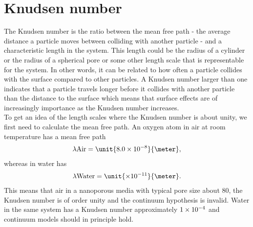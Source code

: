 \section{Knudsen number}
\label{sec:knudsen_number}
The Knudsen number is the ratio between the mean free path - the average distance a particle moves between colliding with another particle - and a characteristic length in the system. This length could be the radius of a cylinder or the radius of a spherical pore or some other length scale that is representable for the system. In other words, it can be related to how often a particle collides with the surface compared to other particles. A Knudsen number larger than one indicates that a particle travels longer before it collides with another particle than the distance to the surface which means that surface effects are of increasingly importance as the Knudsen number increases.\\
To get an idea of the length scales where the Knudsen number is about unity, we first need to calculate the mean free path. An oxygen atom in air at room temperature has a mean free path \cite{denny1993air}
\begin{align}
	\label{eq:air_mfp}
	\lambda{\text{Air}} = \unit{8.0\e{-8}}{\meter},
\end{align}
whereas in water has
\begin{align}
	\label{eq:water_mfp}
	\lambda{\text{Water}} = \unit{\e{-11}}{\meter}.
\end{align}
This means that air in a nanoporous media with typical pore size about \unit{80}{\nano\meter}, the Knudsen number is of order unity and the continuum hypothesis is invalid. Water in the same system has a Knudsen number approximately $1\times 10^{-4}$ and continuum models should in principle hold. 

